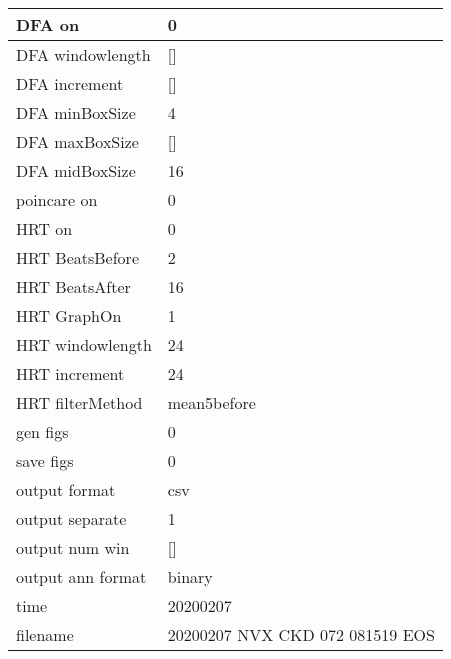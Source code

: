 \begin{tabular}{|l|l|}
DFA on&0\\\hline
DFA windowlength&[]\\\hline
DFA increment&[]\\\hline
DFA minBoxSize&4\\\hline
DFA maxBoxSize&[]\\\hline
DFA midBoxSize&16\\\hline
poincare on&0\\\hline
HRT on&0\\\hline
HRT BeatsBefore&2\\\hline
HRT BeatsAfter&16\\\hline
HRT GraphOn&1\\\hline
HRT windowlength&24\\\hline
HRT increment&24\\\hline
HRT filterMethod&mean5before\\\hline
gen figs&0\\\hline
save figs&0\\\hline
output format&csv\\\hline
output separate&1\\\hline
output num win&[]\\\hline
output ann format&binary\\\hline
time&20200207\\\hline
filename&20200207 NVX CKD 072 081519 EOS\\\hline
\end{tabular}

